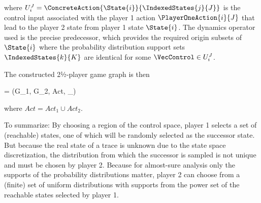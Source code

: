 where $U_i^J = \ConcreteAction{\State{i}}{\IndexedStates{j}{J}}$ is the control input associated with the player 1 action $\PlayerOneAction{i}{J}$ that lead to the player 2 state from player 1 state $\State{i}$.
The dynamics operator used is the precise predecessor, which provides the required origin subsets of $\State{i}$ where the probability distribution support sets $\IndexedStates{k}{K}$ are identical for some $\VecControl \in U_i^J$.

The constructed 2½-player game graph is then

\startformula
    \GameGraph = (G_1, G_2, Act, \Transition_\GameGraph) \EndComma
\stopformula

where $Act = Act_1 \cup Act_2$.

To summarize:
By choosing a region of the control space, player 1 selects a set of (reachable) states, one of which will be randomly selected as the successor state.
But because the real state of a trace is unknown due to the state space discretization, the distribution from which the successor is sampled is not unique and must be chosen by player 2.
Because for almost-sure analysis only the supports of the probability distributions matter, player 2 can choose from a (finite) set of uniform distributions with supports from the power set of the reachable states selected by player 1.

